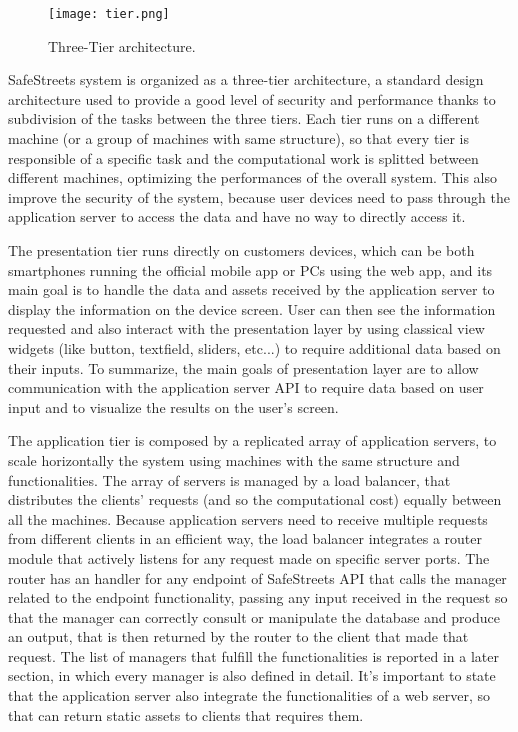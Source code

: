 \begin{figure}[H]
	\centering
	\texttt{[image: tier.png]}
	\caption{Three-Tier architecture.}
\end{figure}

SafeStreets system is organized as a three-tier architecture, a standard design architecture used to provide a good level of security and performance thanks to subdivision of the tasks between the three tiers. Each tier runs on a different machine (or a group of machines with same structure), so that every tier is responsible of a specific task and the computational work is splitted between different machines, optimizing the performances of the overall system. This also improve the security of the system, because user devices need to pass through the application server to access the data and have no way to directly access it. 

The presentation tier runs directly on customers devices, which can be both smartphones running the official mobile app or PCs using the web app, and its main goal is to handle the data and assets received by the application server to display the information on the device screen. User can then see the information requested and also interact with the presentation layer by using classical view widgets (like button, textfield, sliders, etc...) to require additional data based on their inputs. To summarize, the main goals of presentation layer are to allow communication with the application server API to require data based on user input and to visualize the results on the user's screen.

The application tier is composed by a replicated array of application servers, to scale horizontally the system using machines with the same structure and functionalities. The array of servers is managed by a load balancer, that distributes the clients' requests (and so the computational cost) equally between all the machines. Because application servers need to receive multiple requests from different clients in an efficient way, the load balancer integrates a router module that actively listens for any request made on specific server ports. The router has an handler for any endpoint of SafeStreets API that calls the manager related to the endpoint functionality, passing any input received in the request so that the manager can correctly consult or manipulate the database and produce an output, that is then returned by the router to the client that made that request. The list of managers that fulfill the functionalities is reported in a later section, in which every manager is also defined in detail. It's important to state that the application server also integrate the functionalities of a web server, so that can return static assets to clients that requires them.

